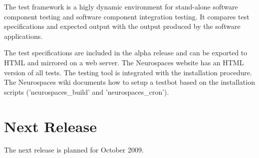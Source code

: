\documentclass[12pt]{article}
\begin{document}
The test framework is a higly dynamic environment for stand-alone
software component testing and software component integration testing.
It compares test specifications and expected output with the output
produced by the software applications.

The test specifications are included in the alpha release and can be
exported to HTML and mirrored on a web server.  The Neurospaces
website has an HTML version of all tests.  The testing tool is
integrated with the installation procedure.  The Neurospaces wiki
documents how to setup a testbot based on the installation scripts
('neurospaces\_build' and 'neurospaces\_cron').



\section{Next Release}

The next release is planned for October 2009.






\end{document}
